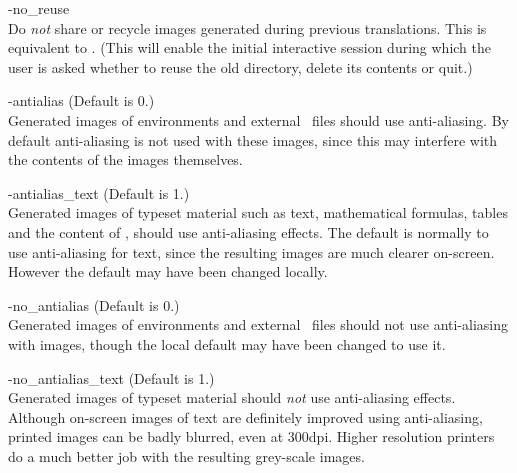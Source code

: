 \begin{htmllist}
\begin{changebar}
%
\item [ -no\_reuse\label{noreuse}]
\\
Do \emph{not} share or recycle images generated during previous translations.
This is equivalent to .
(This will enable the initial interactive session during which the user is
asked whether to reuse the old directory, delete its contents or quit.)%
\end{changebar}


%
\begin{changebar}
\item [ -antialias\label{aalias}]
 (Default is 0.)\\
Generated images of  environments and external \PS\ files
should use anti-aliasing. By default anti-aliasing is not
used with these images, since this may interfere with the contents
of the images themselves.

%
\item [ -antialias\_text\label{aaliastext}]
 (Default is 1.)\\
Generated images of typeset material such as text, mathematical formulas,
tables and the content of  ,
should use anti-aliasing effects.\html{\\}
The default is normally to use anti-aliasing for text, 
since the resulting images are much clearer on-screen. 
However the default may have been changed locally.


%
\item [ -no\_antialias\label{noaalias}]
 (Default is 0.)\\
Generated images of  environments and external \PS\ files 
should not use anti-aliasing with images, 
though the local default may have been changed to use it.


%
\item [ -no\_antialias\_text\label{noaaliastext}]
 (Default is 1.)\\
Generated images of typeset material should \emph{not} use anti-aliasing effects.
Although on-screen images of text are definitely improved using anti-aliasing,
printed images can be badly blurred, even at 300dpi. 
Higher resolution printers do a much better job with the resulting grey-scale images.
\end{changebar}
%
\end{htmllist}


